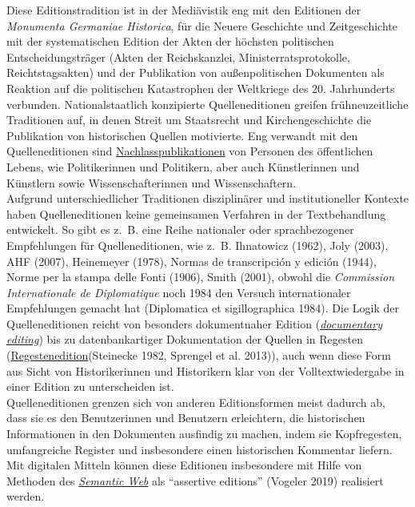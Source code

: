 \documentclass{article}
\begin{document}
        Diese Editionstradition ist in der Mediävistik eng mit den Editionen der \emph{Monumenta Germaniae Historica}, für die Neuere Geschichte und
                  Zeitgeschichte mit der systematischen Edition der Akten der höchsten politischen
                  Entscheidungsträger (Akten der Reichskanzlei, Ministerratsprotokolle,
                  Reichtstagsakten) und der Publikation von außenpolitischen Dokumenten als Reaktion
                  auf die politischen Katastrophen der Weltkriege des 20. Jahrhunderts verbunden.
                  Nationalstaatlich konzipierte Quelleneditionen greifen frühneuzeitliche
                  Traditionen auf, in denen Streit um Staatsrecht und Kirchengeschichte die
                  Publikation von historischen Quellen motivierte. Eng verwandt mit den
                  Quelleneditionen sind \href{http://gams.uni-graz.at/o:konde.140}{Nachlasspublikationen} von Personen des öffentlichen Lebens, wie
                  Politikerinnen und Politikern, aber auch Künstlerinnen und Künstlern sowie
                  Wissenschafterinnen und Wissenschaftern.\\
            
        Aufgrund unterschiedlicher Traditionen disziplinärer und institutioneller Kontexte
                  haben Quelleneditionen keine gemeinsamen Verfahren in der Textbehandlung
                  entwickelt. So gibt es z. B. eine Reihe nationaler oder sprachbezogener
                  Empfehlungen für Quelleneditionen, wie z. B. Ihnatowicz (1962), Joly
                     (2003), AHF (2007), Heinemeyer (1978),
                  Normas de transcripción y edición (1944), Norme per la stampa delle
                  Fonti (1906), Smith (2001), obwohl die \emph{Commission Internationale de Diplomatique} noch 1984 den Versuch
                  internationaler Empfehlungen gemacht hat (Diplomatica et sigillographica
                     1984). Die Logik der Quelleneditionen reicht von besonders dokumentnaher
                  Edition (\emph{\href{http://gams.uni-graz.at/o:konde.72}{documentary editing}}) bis zu datenbankartiger Dokumentation der Quellen in Regesten (\href{http://gams.uni-graz.at/o:konde.162}{Regestenedition}(Steinecke 1982, Sprengel et al. 2013)), auch wenn diese Form aus
                  Sicht von Historikerinnen und Historikern klar von der Volltextwiedergabe in einer
                  Edition zu unterscheiden ist.\\
            
        Quelleneditionen grenzen sich von anderen Editionsformen meist dadurch ab, dass
                  sie es den Benutzerinnen und Benutzern erleichtern, die historischen Informationen
                  in den Dokumenten ausfindig zu machen, indem sie Kopfregesten, umfangreiche
                  Register und insbesondere einen historischen Kommentar liefern. Mit digitalen
                  Mitteln können diese Editionen insbesondere mit Hilfe von Methoden des \emph{\href{http://gams.uni-graz.at/o:konde.167}{Semantic Web}} als “assertive editions” (Vogeler 2019) realisiert werden.\\
            
\end{document}
